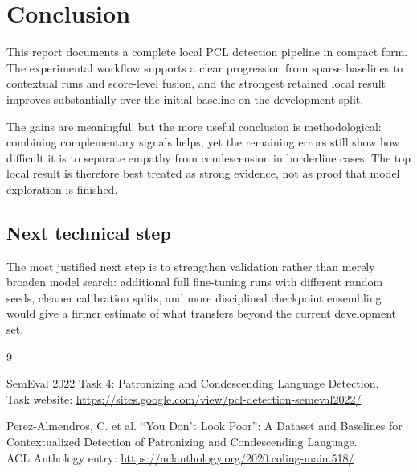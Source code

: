 \documentclass[11pt]{article}
\begin{document}
    \section{Conclusion}
    This report documents a complete local PCL detection pipeline in compact
    form. The experimental workflow supports a clear progression from sparse
    baselines to contextual runs and score-level fusion, and the strongest
    retained local result improves substantially over the initial baseline on
    the development split.

    The gains are meaningful, but the more useful conclusion is methodological:
    combining complementary signals helps, yet the remaining errors still show
    how difficult it is to separate empathy from condescension in borderline
    cases. The top local result is therefore best treated as strong evidence,
    not as proof that model exploration is finished.

    \subsection*{Next technical step}
    The most justified next step is to strengthen validation rather than merely
    broaden model search: additional full fine-tuning runs with different
    random seeds, cleaner calibration splits, and more disciplined checkpoint
    ensembling would give a firmer estimate of what transfers beyond the
    current development set.

    \begin{thebibliography}{9}

    SemEval 2022 Task 4: Patronizing and Condescending Language Detection.\\
    Task website: \url{https://sites.google.com/view/pcl-detection-semeval2022/}

    Perez-Almendros, C. et al. ``You Don't Look Poor'': A Dataset and Baselines for
    Contextualized Detection of Patronizing and Condescending Language.\\
    ACL Anthology entry: \url{https://aclanthology.org/2020.coling-main.518/}

    \end{thebibliography}

    
\end{document}
